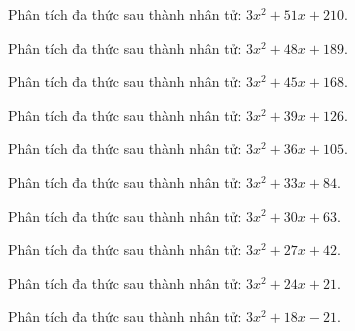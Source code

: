 \begin{bt}
	Phân tích đa thức sau thành nhân tử: $3 x^2 + 51 x + 210$.
\end{bt}
\begin{bt}
	Phân tích đa thức sau thành nhân tử: $3 x^2 + 48 x + 189$.
\end{bt}
\begin{bt}
	Phân tích đa thức sau thành nhân tử: $3 x^2 + 45 x + 168$.
\end{bt}
\begin{bt}
	Phân tích đa thức sau thành nhân tử: $3 x^2 + 39 x + 126$.
\end{bt}
\begin{bt}
	Phân tích đa thức sau thành nhân tử: $3 x^2 + 36 x + 105$.
\end{bt}
\begin{bt}
	Phân tích đa thức sau thành nhân tử: $3 x^2 + 33 x + 84$.
\end{bt}
\begin{bt}
	Phân tích đa thức sau thành nhân tử: $3 x^2 + 30 x + 63$.
\end{bt}
\begin{bt}
	Phân tích đa thức sau thành nhân tử: $3 x^2 + 27 x + 42$.
\end{bt}
\begin{bt}
	Phân tích đa thức sau thành nhân tử: $3 x^2 + 24 x + 21$.
\end{bt}
\begin{bt}
	Phân tích đa thức sau thành nhân tử: $3 x^2 + 18 x - 21$.
\end{bt}

